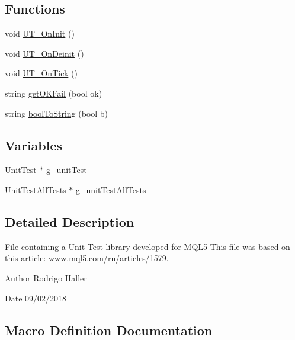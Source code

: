 \subsection*{Functions}
\begin{DoxyCompactItemize}
\item 
void \mbox{\hyperlink{_unit_test_8mqh_a9cdc57544d91884fab6f627b3394326f}{U\+T\+\_\+\+On\+Init}} ()
\item 
void \mbox{\hyperlink{_unit_test_8mqh_a9fbaaa20ba4e1624e348f7ab5109ecbf}{U\+T\+\_\+\+On\+Deinit}} ()
\item 
void \mbox{\hyperlink{_unit_test_8mqh_afcdc18c227067029c1bb10f935bdb21c}{U\+T\+\_\+\+On\+Tick}} ()
\item 
string \mbox{\hyperlink{_unit_test_8mqh_a560d9b8bdbe896abd079b6c9d7bd107f}{get\+O\+K\+Fail}} (bool ok)
\item 
string \mbox{\hyperlink{_unit_test_8mqh_a846b4d0b246628bc40f57371459bdf2f}{bool\+To\+String}} (bool b)
\end{DoxyCompactItemize}
\subsection*{Variables}
\begin{DoxyCompactItemize}
\item 
\mbox{\hyperlink{class_unit_test}{Unit\+Test}} $\ast$ \mbox{\hyperlink{_unit_test_8mqh_a5e34117a894ec401dfa22c9ac4dd2bab}{g\+\_\+unit\+Test}}
\item 
\mbox{\hyperlink{class_unit_test_all_tests}{Unit\+Test\+All\+Tests}} $\ast$ \mbox{\hyperlink{_unit_test_8mqh_ac4c2170c0847569eb60570a7d2376a50}{g\+\_\+unit\+Test\+All\+Tests}}
\end{DoxyCompactItemize}


\subsection{Detailed Description}
File containing a Unit Test library developed for M\+Q\+L5 This file was based on this article\+: www.\+mql5.\+com/ru/articles/1579. 

\begin{DoxyAuthor}{Author}
Rodrigo Haller 
\end{DoxyAuthor}
\begin{DoxyDate}{Date}
09/02/2018 
\end{DoxyDate}


\subsection{Macro Definition Documentation}
\mbox{\label{_unit_test_8mqh_afdcc024902d14669b7a22158e646299b}} 
